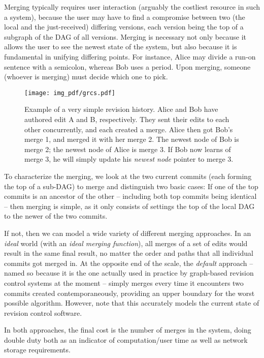 \documentclass[letterpaper,conference]{IEEEtran}
\begin{document}
Merging typically requires user interaction (arguably the costliest resource in such a system), because the user may have to find a compromise between two (the local and the just-received) differing versions, each version being the top of a subgraph of the DAG of all versions. Merging is necessary not only because it allows the user to see the newest state of the system, but also because it is fundamental in unifying differing points. For instance, Alice may divide a run-on sentence with a semicolon, whereas Bob uses a period. Upon merging, someone (whoever is merging) must decide which one to pick.

\begin{figure}
  \texttt{[image: img\_pdf/grcs.pdf]}
  \caption{Example of a very simple revision history. Alice and Bob have authored edit A and B, respectively. They sent their edits to each other concurrently, and each created a merge. Alice then got Bob's merge 1, and merged it with her merge 2. The newest node of Bob is merge 2; the newest node of Alice is merge 3. If Bob now learns of merge 3, he will simply update his \textit{newest node} pointer to merge 3.}
  \label{fig:grcs}
\end{figure}

To characterize the merging, we look at the two current commits (each forming the top of a sub-DAG) to merge and distinguish two basic cases: If one of the top commits is an ancestor of the other -- including both top commits being identical -- then merging is simple, as it only consists of settings the top of the local DAG to the newer of the two commits.

If not, then we can model a wide variety of different merging approaches. In an \textit{ideal} world (with an \textit{ideal merging function}), all merges of a set of edits would result in the same final result, no matter the order and paths that all individual commits got merged in. At the opposite end of the scale, the \textit{default} approach -- named so because it is the one actually used in practice by graph-based revision control systems at the moment -- simply merges every time it encounters two commits created contemporaneously, providing an upper boundary for the worst possible algorithm. However, note that this accurately models the current state of revision control software.

In both approaches, the final cost is the number of merges in the system, doing double duty both as an indicator of computation/user time as well as network storage requirements.
\end{document}
